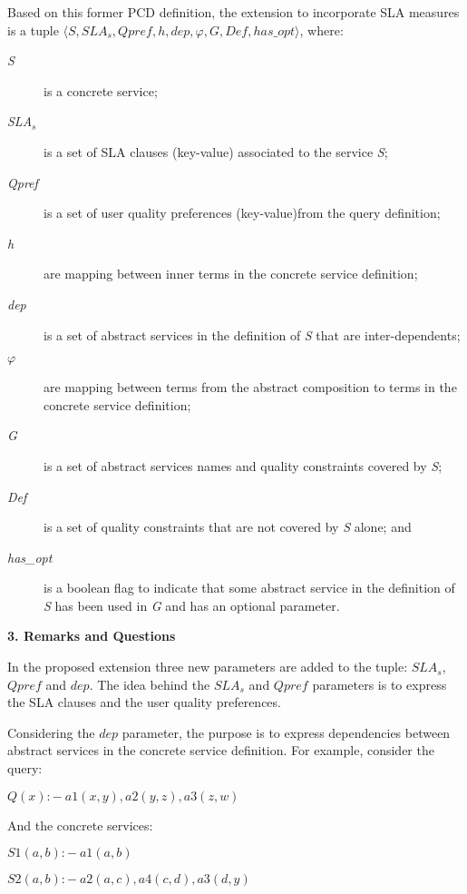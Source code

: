 \documentclass[12pt,a4paper,oneside]{report}
\begin{document}
Based on this former PCD definition, the extension to incorporate SLA measures is a tuple $\langle S, SLA_s, Qpref, h, dep, \varphi, G, Def, has\_opt\rangle$, where: 
\begin{description}
\item[\textit{S}] is a concrete service;
\item[\textit{SLA$_s$}] is a set of SLA clauses (key-value) associated to the service \textit{S};
\item[\textit{Qpref}] is a set of user quality preferences (key-value)from the query definition;
\item[\textit{h}] are mapping between inner terms in the concrete service definition;
\item[\textit{dep}] is a set of abstract services in the definition of \textit{S} that are inter-dependents;
\item[\textit{$\varphi$}] are mapping between terms from the abstract composition to terms in the concrete service definition;
\item[\textit{G}] is a set of abstract services names and quality constraints covered by \textit{S};
\item[\textit{Def}] is a set of quality constraints that are not covered by \textit{S} alone; and
\item[\textit{has\_opt}] is a boolean flag to indicate that some abstract service in the definition of \textit{S} has been used in \textit{G} and has an optional parameter.
\end{description}

\begin{flushleft}
\textbf{3. Remarks and Questions}
\end{flushleft}

In the proposed extension three new parameters are added to the tuple: \textbf{$SLA_s$}, \textbf{$Qpref$} and \textbf{$dep$}. The idea behind the \textbf{$SLA_s$} and \textbf{$Qpref$} parameters is to express the SLA clauses and the user quality preferences. 

Considering the \textbf{$dep$} parameter, the purpose is to express dependencies between abstract services in the concrete service definition. For example, consider the query:

\begin{description}
\item $Q(x) :-  \ a1(x,y),a2(y,z),a3(z,w)$
\end{description}

 And the concrete services: 
\begin{description}
\item $S1(a,b) :- \ a1(a,b)$
\item $S2(a,b) :- \ a2(a,c),a4(c, d),a3(d,y)$
\end{description} 
\end{document}
